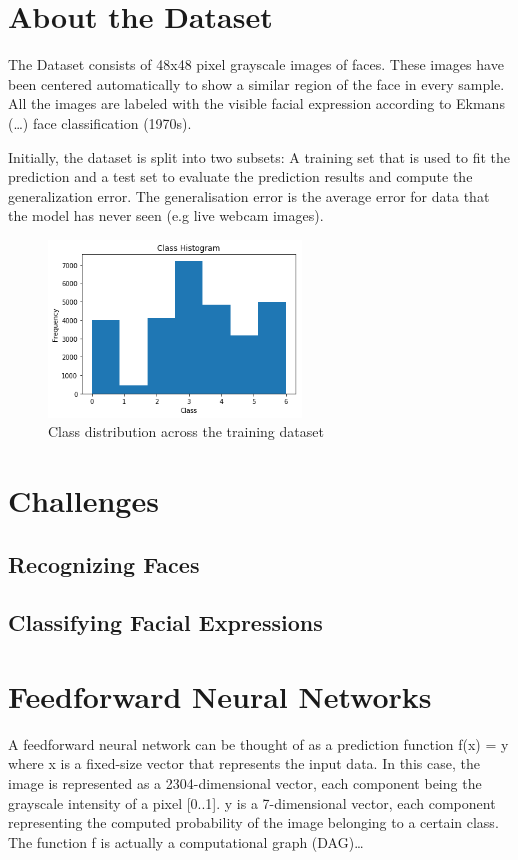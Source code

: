 \documentclass[a4paper,english]{report}
\begin{document}
        \chapter{About the Dataset}
        
        The Dataset consists of 48x48 pixel grayscale images of faces. 
        These images have been centered automatically to show a similar 
        region of the face in every sample. All the images are labeled
        with the visible facial expression according to Ekmans (…) face classification (1970s).
        
        Initially, the dataset is split into two subsets: A training set 
        that is used to fit the prediction and a test set to evaluate the prediction results and compute the generalization error. The generalisation error is the average error for data that the model has never seen (e.g live webcam images).



        \begin{figure}[h]
            \centering
            \includegraphics[width=0.6\textwidth]{figures/class_dist.png}
            \caption{Class distribution across the training dataset}
            \label{fig:classdist}
        \end{figure}
        
        
        \chapter{Challenges}
        \section{Recognizing Faces}
        \section{Classifying Facial Expressions}
        \chapter{Feedforward Neural Networks}
        A feedforward neural network can be thought of as a prediction function f(x) = y where x is a fixed-size vector that represents the input data. In this
        case, the image is represented as a 2304-dimensional vector, each component
        being the grayscale intensity of a pixel [0..1]. y is a 7-dimensional vector,
        each component representing the computed probability of the image belonging 
        to a certain class. The function f is actually a computational graph (DAG)…
        
\end{document}
